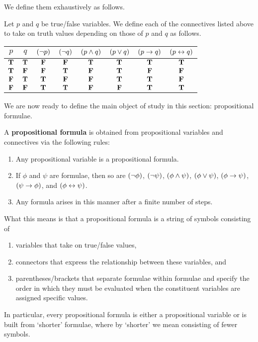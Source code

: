 We define them exhaustively as follows.
\begin{boxdefinition}[Connectives]\label{Ch1:Def:Connective}
    Let $p$ and $q$ be true/false variables. We define each of the connectives listed above to take on truth values depending on those of $p$ and $q$ as follows.
    \begin{table}[H]
        \centering
        \begin{tabular}{cc|cccccc}
             $p$ & $q$ & $\left( \neg p \right)$ & $\left( \neg q \right)$ & $\left( p \land q \right)$ & $\left( p \lor q \right)$ & $\left( p \to q \right)$ & $\left( p \leftrightarrow q \right)$ \\
             \hline
             $\mathbf{T}$ & $\mathbf{T}$ & $\mathbf{F}$ & $\mathbf{F}$ & $\mathbf{T}$ & $\mathbf{T}$ & $\mathbf{T}$ & $\mathbf{T}$ \\
             $\mathbf{T}$ & $\mathbf{F}$ & $\mathbf{F}$ & $\mathbf{T}$ & $\mathbf{F}$ & $\mathbf{T}$ & $\mathbf{F}$ & $\mathbf{F}$ \\
             $\mathbf{F}$ & $\mathbf{T}$ & $\mathbf{T}$ & $\mathbf{F}$ & $\mathbf{F}$ & $\mathbf{T}$ & $\mathbf{T}$ & $\mathbf{F}$ \\
             $\mathbf{F}$ & $\mathbf{F}$ & $\mathbf{T}$ & $\mathbf{T}$ & $\mathbf{F}$ & $\mathbf{F}$ & $\mathbf{T}$ & $\mathbf{T}$
        \end{tabular}
        \label{tab:my_label}
    \end{table}
\end{boxdefinition}

We are now ready to define the main object of study in this section: propositional formulae.

\begin{boxdefinition}\label{Ch1:Def:PropFormula}
    A \textbf{propositional formula} is obtained from propositional variables and connectives via the following rules:
    \begin{enumerate}[label=\normalfont (\roman*), noitemsep]
        \item Any propositional variable is a propositional formula.
        \item If $\phi$ and $\psi$ are formulae, then so are $\left( \neg \phi \right)$, $\left( \neg \psi \right)$, $\left( \phi \land \psi \right)$, $\left( \phi \lor \psi \right)$, $\left( \phi \to \psi \right)$, $\left( \psi \to \phi \right)$, and $\left( \phi \leftrightarrow \psi \right)$.
        \item Any formula arises in this manner after a finite number of steps.
    \end{enumerate}
\end{boxdefinition}

What this means is that a propositional formula is a string of symbols consisting of
\begin{enumerate}[noitemsep]
    \item variables that take on true/false values,
    \item connectors that express the relationship between these variables, and
    \item parentheses/brackets that separate formulae within formulae and specify the order in which they must be evaluated when the constituent variables are assigned specific values.
\end{enumerate}
In particular, every propositional formula is either a propositional variable or is built from `shorter' formulae, where by `shorter' we mean consisting of fewer symbols.

